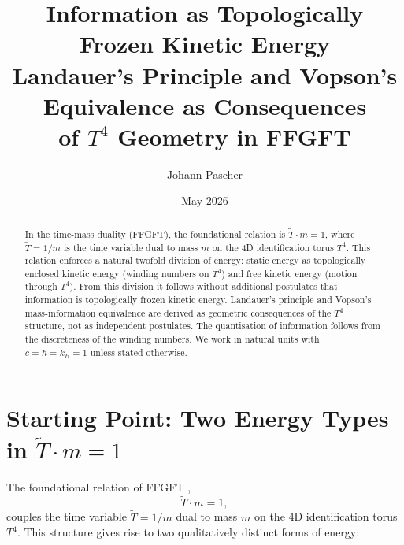 
\title{Information as Topologically Frozen Kinetic Energy\\[0.4em]
\large Landauer's Principle and Vopson's Equivalence as Consequences\\
of \(T^4\) Geometry in FFGFT}
\author{Johann Pascher}
\date{May 2026}
\maketitle

\begin{abstract}
In the time-mass duality (FFGFT), the foundational relation is
\(\tilde{T} \cdot m = 1\),
where \(\tilde{T} = 1/m\) is the time variable dual to mass \(m\)
on the 4D identification torus \(T^4\).
This relation enforces a natural twofold division of energy:
static energy as topologically enclosed kinetic energy
(winding numbers on \(T^4\)) and free kinetic energy
(motion through \(T^4\)).
From this division it follows without additional postulates
that information is topologically frozen kinetic energy.
Landauer's principle \cite{Landauer1961} and Vopson's
mass-information equivalence \cite{Vopson2019}
are derived as geometric consequences of the \(T^4\) structure,
not as independent postulates.
The quantisation of information follows from the discreteness
of the winding numbers.
We work in natural units with \(c = \hbar = k_B = 1\)
unless stated otherwise.
\end{abstract}

\tableofcontents
\newpage

\section{Starting Point: Two Energy Types in \(\tilde{T} \cdot m = 1\)}

The foundational relation of FFGFT \cite{Pascher2026},
\begin{equation}
  \tilde{T} \cdot m = 1,
\end{equation}
couples the time variable \(\tilde{T} = 1/m\) dual to mass \(m\)
on the 4D identification torus \(T^4\).
This structure gives rise to two qualitatively distinct forms of energy:

